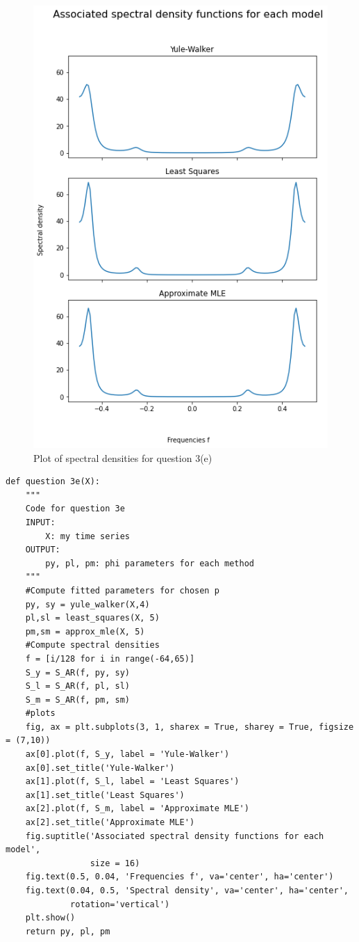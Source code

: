 \documentclass[a4paper,10pt]{article}
\theoremstyle{mytheor}
\begin{document}
\begin{figure}[h!]
    \centering
    \includegraphics[width = 0.6\columnwidth]{plot_3e.png}
    \caption{Plot of spectral densities for question 3(e)}
    \label{plot3e}
\end{figure}

\begin{lstlisting}
def question 3e(X):
    """
    Code for question 3e
    INPUT:
        X: my time series
    OUTPUT: 
        py, pl, pm: phi parameters for each method
    """
    #Compute fitted parameters for chosen p
    py, sy = yule_walker(X,4)
    pl,sl = least_squares(X, 5)
    pm,sm = approx_mle(X, 5)
    #Compute spectral densities
    f = [i/128 for i in range(-64,65)]
    S_y = S_AR(f, py, sy)
    S_l = S_AR(f, pl, sl)
    S_m = S_AR(f, pm, sm)
    #plots
    fig, ax = plt.subplots(3, 1, sharex = True, sharey = True, figsize = (7,10))
    ax[0].plot(f, S_y, label = 'Yule-Walker')
    ax[0].set_title('Yule-Walker')
    ax[1].plot(f, S_l, label = 'Least Squares')
    ax[1].set_title('Least Squares')
    ax[2].plot(f, S_m, label = 'Approximate MLE')
    ax[2].set_title('Approximate MLE')
    fig.suptitle('Associated spectral density functions for each model',
                 size = 16)
    fig.text(0.5, 0.04, 'Frequencies f', va='center', ha='center')
    fig.text(0.04, 0.5, 'Spectral density', va='center', ha='center', 
             rotation='vertical')
    plt.show()
    return py, pl, pm
\end{lstlisting}
\end{document}
